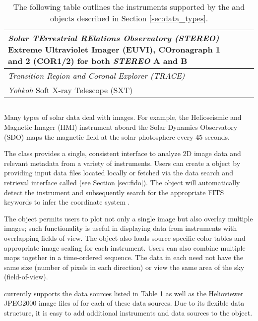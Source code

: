 \begin{table}
\begin{center}
\begin{tabular}{|p{10cm}|c|c|}
\hline
\textit{Solar TErrestrial RElations Observatory (STEREO)} Extreme Ultraviolet Imager (EUVI), COronagraph 1 and 2 (COR1/2) for both \textit{STEREO} A and B & \citep{howard2008sun} \\
\hline
\textit{Transition Region and Coronal Explorer (TRACE)}  & \citep{handy99}  \\
\hline
\textit{Yohkoh} Soft X-ray Telescope (SXT) & \citep{tsuneta1991soft}  \\
\hline
\end{tabular}
\end{center}
\caption{The following table outlines the instruments supported by the \Timeseries and \Map objects described in Section \ref{sec:data_types}.}
\label{tab:instruments}
\end{table}

\subsection{\Map}
\label{sec:map}
Many types of solar data deal with images. For example, the Helioseismic and Magnetic Imager (HMI) instrument aboard the Solar Dynamics Observatory (SDO) maps the magnetic field at the solar photosphere every 45 seconds. 

The \Map class provides a single, consistent interface to analyze 2D image data and relevant metadata from a variety of instruments. 
Users can create a \Map object by providing input data files located locally or fetched via the \sunpypkg data search and retrieval interface called \Fido (see Section \ref{sec:fido}). The \Map object will automatically detect the instrument and subsequently search for the appropriate FITS keywords to infer the coordinate system \citep{refId0, 2006A&A...449..791T}.

The \Map object permits users to plot not only a single image but also overlay multiple images; such functionality is useful in displaying data from instruments with overlapping fields of view. The \Map object also loads source-specific color tables and appropriate image scaling for each instrument.
Users can also combine multiple maps together in a time-ordered sequence. The data in each \Map need not have the same size (number of pixels in each direction) or view the same area of the sky (field-of-view). 

\Map currently supports the data sources listed in Table \ref{tab:instruments} as well as the Helioviewer JPEG2000 image files of for each of these data sources. Due to its flexible data structure, it is easy to add additional instruments and data sources to the \Map object.
